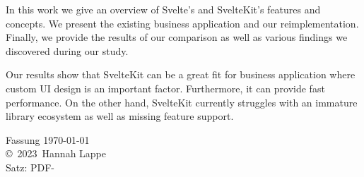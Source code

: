 \documentclass[a4paper,
fontsize=12pt,
headsepline,           %
oneside,               %
number=noenddot,       %
bibliography=totoc,    %
BCOR=15mm              %
]{scrbook}
\newcommand{\fullname}{Hannah Lappe}
\newcommand{\jahr}{2023}
\newcommand{\matnr}{922114}
\begin{document}
In this work we give an overview of Svelte's and SvelteKit's features and concepts. We present the existing business application and our reimplementation. Finally, we provide the results of our comparison as well as various findings we discovered during our study.

Our results show that SvelteKit can be a great fit for business application where custom UI design is an important factor. Furthermore, it can provide fast performance. On the other hand, SvelteKit currently struggles with an immature library ecosystem as well as missing feature support.

{ \small
  \vfill
  \begin{center}
  Fassung \today \\
  \copyright~\jahr~\fullname\\[0.5em]
  Satz: PDF-\LaTeXe
  \end{center}
}


\tableofcontents

\mainmatter







\appendix


\backmatter

\printbibliography








\end{document}
